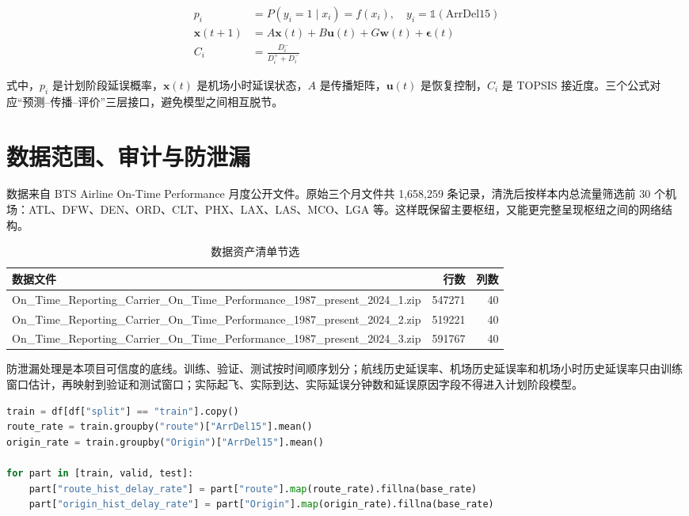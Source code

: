 \documentclass[UTF8,zihao=-4]{ctexart}
\begin{document}
\begin{align}
p_i &= P(y_i=1\mid x_i)=f(x_i), \quad y_i=\mathbb{1}(\mathrm{ArrDel15})\\
\bm{x}(t+1) &= A\bm{x}(t)+B\bm{u}(t)+G\bm{w}(t)+\bm{\epsilon}(t)\\
C_i &= \frac{D_i^-}{D_i^+ + D_i^-}
\end{align}

式中，$p_i$ 是计划阶段延误概率，$\bm{x}(t)$ 是机场小时延误状态，$A$ 是传播矩阵，$\bm{u}(t)$ 是恢复控制，$C_i$ 是 TOPSIS 接近度。三个公式对应“预测--传播--评价”三层接口，避免模型之间相互脱节。

\section{数据范围、审计与防泄漏}
数据来自 BTS Airline On-Time Performance 月度公开文件。原始三个月文件共 1,658,259 条记录，清洗后按样本内总流量筛选前 30 个机场：ATL、DFW、DEN、ORD、CLT、PHX、LAX、LAS、MCO、LGA 等。这样既保留主要枢纽，又能更完整呈现枢纽之间的网络结构。

\begin{table}[H]\centering\caption{数据资产清单节选}
\begin{tabular}{lrr}
\toprule
数据文件 & 行数 & 列数 \\
\midrule
On\_Time\_Reporting\_Carrier\_On\_Time\_Performance\_1987\_present\_2024\_1.zip & 547271 & 40 \\
On\_Time\_Reporting\_Carrier\_On\_Time\_Performance\_1987\_present\_2024\_2.zip & 519221 & 40 \\
On\_Time\_Reporting\_Carrier\_On\_Time\_Performance\_1987\_present\_2024\_3.zip & 591767 & 40 \\
\bottomrule
\end{tabular}
\end{table}

防泄漏处理是本项目可信度的底线。训练、验证、测试按时间顺序划分；航线历史延误率、机场历史延误率和机场小时历史延误率只由训练窗口估计，再映射到验证和测试窗口；实际起飞、实际到达、实际延误分钟数和延误原因字段不得进入计划阶段模型。

\begin{lstlisting}[language=Python,caption={时间切分与历史风险映射}]
train = df[df["split"] == "train"].copy()
route_rate = train.groupby("route")["ArrDel15"].mean()
origin_rate = train.groupby("Origin")["ArrDel15"].mean()

for part in [train, valid, test]:
    part["route_hist_delay_rate"] = part["route"].map(route_rate).fillna(base_rate)
    part["origin_hist_delay_rate"] = part["Origin"].map(origin_rate).fillna(base_rate)
\end{lstlisting}
\end{document}
